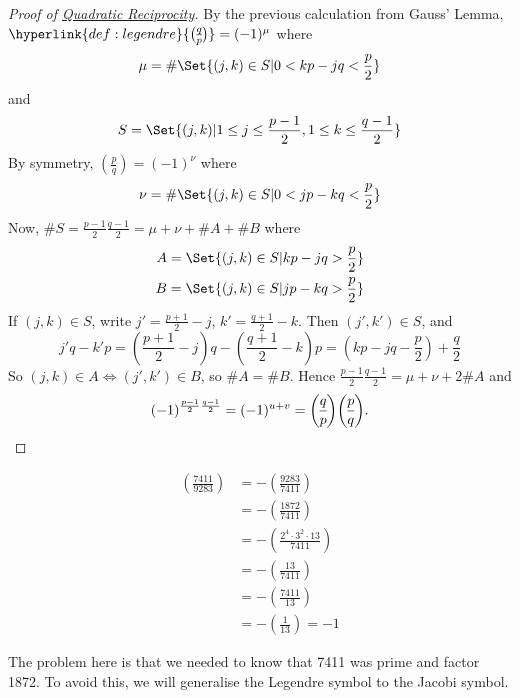 \documentclass{article}
\newcommand{\legendre}[2]{\genfrac{(}{)}{}{}{#1}{#2}}
\begin{document}
\begin{proof}[Proof of \hyperlink{thm:qr}{Quadratic Reciprocity}]
    By the previous calculation from Gauss' Lemma, $\hyperlink{def:legendre}{\legendre{q}{p}} = (-1)^\mu$
    where
    \begin{equation*}
        \mu =\#\Set{(j, k) \in S | 0 < kp - jq < \frac{p}{2}}
    \end{equation*}
    and
    \begin{equation*}
        S = \Set{(j, k) | 1 \leq j \leq \frac{p-1}{2}, 1 \leq k \leq \frac{q-1}{2}}
    \end{equation*}
    By symmetry, $\legendre{p}{q} = (-1)^\nu$ where
    \begin{equation*}
        \nu =\#\Set{(j, k) \in S | 0 < jp - kq < \frac{p}{2}}
    \end{equation*}
    Now, $\#S = \frac{p-1}{2} \frac{q-1}{2} = \mu + \nu + \#A + \#B$ where
    \begin{align*}
        A = \Set{(j, k) \in S | kp - jq > \frac{p}{2}} \\
        B = \Set{(j, k) \in S | jp - kq > \frac{p}{2}}
    \end{align*}
    If $(j, k) \in S$, write $j' = \frac{p+1}{2} - j$, $k' = \frac{q+1}{2} - k$.
    Then $(j', k') \in S$, and
    \begin{equation*}
        j'q - k'p = \left(\frac{p+1}{2} - j\right) q - \left(\frac{q+1}{2} - k\right) p = \left(kp - jq - \frac{p}{2}\right) + \frac{q}{2}
    \end{equation*}
    So $(j, k) \in A \iff (j', k') \in B$, so $\#A = \#B$.
    Hence $\frac{p-1}{2} \frac{q-1}{2} = \mu + \nu + 2 \#A$ and
    \begin{equation*}
        (-1)^{\frac{p-1}{2} \frac{q-1}{2}} = (-1)^{u+v} = \legendre{q}{p} \legendre{p}{q}.\qedhere
    \end{equation*}
\end{proof}

\begin{eg}
    \begin{align*}
        \legendre{7411}{9283} &= -\legendre{9283}{7411} \\
                              &= -\legendre{1872}{7411} \\
                              &= -\legendre{2^4 \cdot 3^2 \cdot 13}{7411} \\
                              &= -\legendre{13}{7411} \\
                              &= -\legendre{7411}{13} \\
                              &= -\legendre{1}{13} = -1
    \end{align*}

    The problem here is that we needed to know that 7411 was prime and factor 1872.
    To avoid this, we will generalise the Legendre symbol to the Jacobi symbol.
\end{eg}
\end{document}
